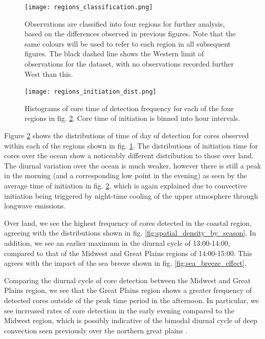 \begin{figure}[t]
    \centering
    \texttt{[image: regions\_classification.png]}
    \caption{Observations are classified into four regions for further analysis, based on the differences observed in previous figures. Note that the same colours will be used to refer to each region in all subsequent figures. The black dashed line shows the Western limit of observations for the dataset, with no observations recorded further West than this.}
    \label{fig:regions}
\end{figure}

\begin{figure}[h]
    \centering
    \texttt{[image: regions\_initiation\_dist.png]}
    \caption{Histograms of core time of detection frequency for each of the four regions in fig. \ref{fig:regional_tod}. Core time of initiation is binned into hour intervals.}
    \label{fig:regional_tod}
\end{figure}

Figure \ref{fig:regional_tod} shows the distributions of time of day of detection for cores observed within each of the regions shown in fig. \ref{fig:regions}.
The distributions of initiation time for cores over the ocean show a noticeably different distribution to those over land.
The diurnal variation over the ocean is much weaker, however there is still a peak in the morning (and a corresponding low point in the evening) as seen by the average time of initiation in fig. \ref{fig:regional_tod}, which is again explained due to convective initiation being triggered by night-time cooling of the upper atmosphere through longwave emissions.

Over land, we see the highest frequency of cores detected in the coastal region, agreeing with the distributions shown in fig. \ref{fig:spatial_density_by_season}.
In addition, we see an earlier maximum in the diurnal cycle of 13:00-14:00, compared to that of the Midwest and Great Plains regions of 14:00-15:00.
This agrees with the impact of the sea breeze shown in fig. \ref{fig:sea_breeze_effect}.

Comparing the diurnal cycle of core detection between the Midwest and Great Plains region, we see that the Great Plains region shows a greater frequency of detected cores outside of the peak time period in the afternoon.
In particular, we see increased rates of core detection in the early evening compared to the Midwest region, which is possibly indicative of the bimodal diurnal cycle of deep convection seen previously over the northern great plains \citep{feng_spatiotemporal_2019, li_high-resolution_2021}.

